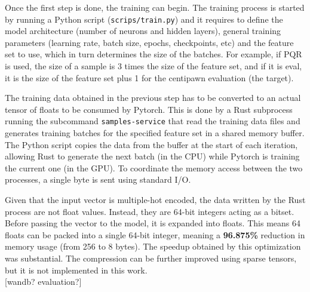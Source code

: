 Once the first step is done, the training can begin. The training process is started by running a Python script (\texttt{scrips/train.py}) and it requires to define the model architecture (number of neurons and hidden layers), general training parameters (learning rate, batch size, epochs, checkpoints, etc) and the feature set to use, which in turn determines the size of the batches. For example, if PQR is used, the size of a sample is 3 times the size of the feature set, and if it is eval, it is the size of the feature set plus 1 for the centipawn evaluation (the target).

The training data obtained in the previous step has to be converted to an actual tensor of floats to be consumed by Pytorch. This is done by a Rust subprocess running the subcommand \texttt{samples-service} that read the training data files and generates training batches for the specified feature set in a shared memory buffer. The Python script copies the data from the buffer at the start of each iteration, allowing Rust to generate the next batch (in the CPU) while Pytorch is training the current one (in the GPU). To coordinate the memory access between the two processes, a single byte is sent using standard I/O.

Given that the input vector is multiple-hot encoded, the data written by the Rust process are not float values. Instead, they are 64-bit integers acting as a bitset. Before passing the vector to the model, it is expanded into floats. This means 64 floats can be packed into a single 64-bit integer, meaning a \textbf{96.875\%} reduction in memory usage (from 256 to 8 bytes). The speedup obtained by this optimization was substantial. The compression can be further improved using sparse tensors, but it is not implemented in this work. \\

[wandb? evaluation?]


